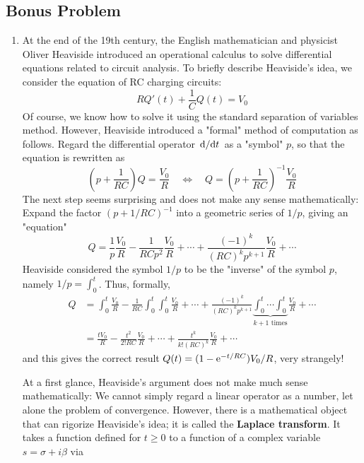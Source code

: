 \documentclass[../psets.tex]{subfiles}
\begin{document}
\subsection*{Bonus Problem}
\begin{enumerate}
    \item At the end of the 19th century, the English mathematician and physicist Oliver Heaviside introduced an operational calculus to solve differential equations related to circuit analysis. To briefly describe Heaviside's idea, we consider the equation of RC charging circuits:
    \begin{equation*}
        RQ'(t)+\frac{1}{C}Q(t) = V_0
    \end{equation*}
    Of course, we know how to solve it using the standard separation of variables method. However, Heaviside introduced a "formal" method of computation as follows. Regard the differential operator $\dv*{t}$ as a "symbol" $p$, so that the equation is rewritten as
    \begin{equation*}
        \left( p+\frac{1}{RC} \right)Q = \frac{V_0}{R}
        \quad\Longleftrightarrow\quad
        Q = \left( p+\frac{1}{RC} \right)^{-1}\frac{V_0}{R}
    \end{equation*}
    The next step seems surprising and does not make any sense mathematically: Expand the factor $(p+1/RC)^{-1}$ into a geometric series of $1/p$, giving an "equation"
    \begin{equation*}
        Q = \frac{1}{p}\frac{V_0}{R}-\frac{1}{RCp^2}\frac{V_0}{R}+\cdots+\frac{(-1)^k}{(RC)^kp^{k+1}}\frac{V_0}{R}+\cdots
    \end{equation*}
    Heaviside considered the symbol $1/p$ to be the "inverse" of the symbol $p$, namely $1/p=\int_0^t$. Thus, formally,
    \begin{align*}
        Q &= \int_0^t\frac{V_0}{R}-\frac{1}{RC}\int_0^t\int_0^t\frac{V_0}{R}+\cdots+\frac{(-1)^k}{(RC)^kp^{k+1}}\underbrace{\int_0^t\cdots\int_0^t}_{k+1\text{ times}}\frac{V_0}{R}+\cdots\\
        &= \frac{tV_0}{R}-\frac{t^2}{2!RC}\frac{V_0}{R}+\cdots+\frac{t^k}{k!(RC)^k}\frac{V_0}{R}+\cdots
    \end{align*}
    and this gives the correct result $Q(t)=(1-\e[-t/RC])V_0/R$, very strangely!\par
    At a first glance, Heaviside's argument does not make much sense mathematically: We cannot simply regard a linear operator as a number, let alone the problem of convergence. However, there is a mathematical object that can rigorize Heaviside's idea; it is called the \textbf{Laplace transform}. It takes a function defined for $t\geq 0$ to a function of a complex variable $s=\sigma+i\beta$ via

\end{enumerate}
\end{document}

